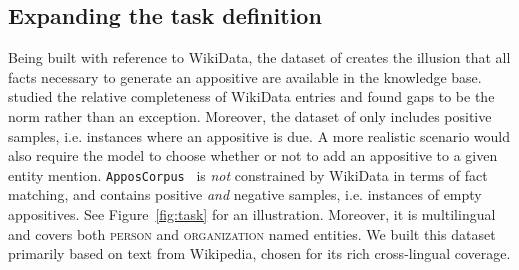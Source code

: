 \documentclass[11pt]{article}
\newcommand{\yktodo}[1]{\todo[color=green!20]{#1}}
\newcommand{\jttodo}[1]{\todo[color=blue!20]{#1}}
\newcommand{\corpus}{\texttt{ApposCorpus}}
\begin{document}
\subsection{Expanding the task definition}
\label{ssec:issues}
Being built with reference to WikiData, the dataset of  creates the illusion that all facts necessary to generate an appositive are available in the knowledge base.  studied the relative completeness of WikiData entries and found gaps to be the norm rather than an exception. Moreover, the dataset of  only includes positive samples, i.e. instances where an appositive is due. A more realistic scenario would also require the model to choose whether or not to add an appositive to a given entity mention. \corpus~ is \textit{not} constrained by WikiData in terms of fact matching, and contains positive \textit{and} negative samples, i.e. instances of empty appositives. See Figure~\ref{fig:task} for an illustration. Moreover, it is multilingual and covers both \textsc{person} and \textsc{organization} named entities. We built this dataset primarily based on text from Wikipedia, chosen for its rich cross-lingual coverage.
\end{document}

